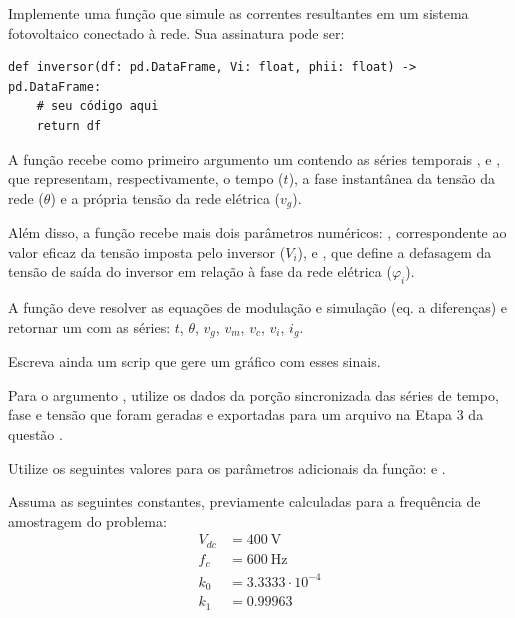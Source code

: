 Implemente uma função que simule as correntes resultantes em um sistema fotovoltaico conectado à rede.
Sua assinatura pode ser:
\begin{verbatim}
def inversor(df: pd.DataFrame, Vi: float, phii: float) -> pd.DataFrame:
    # seu código aqui
    return df
\end{verbatim}

A função recebe como primeiro argumento um  contendo as séries temporais ,  e , que representam,
respectivamente, o tempo ($t$), a fase instantânea da tensão da rede ($\theta$) e a própria tensão da rede
elétrica ($v_g$).

Além disso, a função recebe mais dois parâmetros numéricos: , correspondente ao valor eficaz da tensão imposta pelo inversor ($V_i$), e , que define a defasagem da tensão de saída do inversor
em relação à fase da rede elétrica ($\varphi_i$).


A função deve resolver as equações de modulação e simulação (eq. a diferenças) e retornar um  com as séries:
$t$, $\theta$, $v_g$, $v_m$, $v_c$, $v_i$, $i_g$.

Escreva ainda um scrip que gere um gráfico com esses sinais.

Para o argumento , utilize os dados da porção sincronizada das séries de tempo, fase e tensão que foram
geradas e exportadas para um arquivo  na Etapa 3 da questão .

Utilize os seguintes valores para os parâmetros adicionais da função:  e .

Assuma as seguintes constantes, previamente calculadas para a frequência de amostragem do problema:
\begin{equation}
    \label{eq:const}
    \begin{aligned}
        V_{dc} &= 400~\text{V}\\
        f_{c} &= 600~\text{Hz} \\
        k_{0} &=  3.3333 \cdot 10^{-4} \\
        k_{1} &= 0.99963\\
    \end{aligned}
\end{equation}


